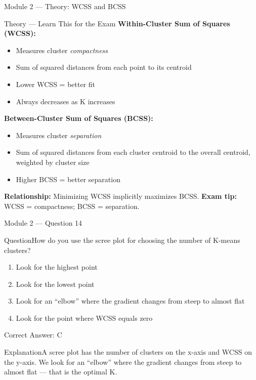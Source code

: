 \documentclass[aspectratio=169,10pt]{beamer}
\newcommand{\question}[1]{\begin{block}{Question}#1\end{block}}
\newcommand{\options}[4]{%
	\begin{enumerate}[label=\Alph*.,leftmargin=*]
		\item #1
		\item #2
		\item #3
		\item #4
	\end{enumerate}
}
\newcommand{\answerbox}[1]{\begin{exampleblock}{Correct Answer: #1}\end{exampleblock}}
\newcommand{\explain}[1]{\begin{block}{Explanation}#1\end{block}}
\newcommand{\theory}[1]{%
	\begin{block}{Theory --- Learn This for the Exam}
		\small #1
	\end{block}
}
\begin{document}
	\begin{frame}{Module 2 --- Theory: WCSS and BCSS}
		\theory{
			\textbf{Within-Cluster Sum of Squares (WCSS):}
			\begin{itemize}
				\item Measures cluster \emph{compactness}
				\item Sum of squared distances from each point to its centroid
				\item Lower WCSS = better fit
				\item Always decreases as K increases
			\end{itemize}
			\textbf{Between-Cluster Sum of Squares (BCSS):}
			\begin{itemize}
				\item Measures cluster \emph{separation}
				\item Sum of squared distances from each cluster centroid to the overall centroid, weighted by cluster size
				\item Higher BCSS = better separation
			\end{itemize}
			\textbf{Relationship:} Minimizing WCSS implicitly maximizes BCSS.
			\textbf{Exam tip:} WCSS = compactness; BCSS = separation.
		}
	\end{frame}
	
	\begin{frame}{Module 2 --- Question 14}
		\question{How do you use the scree plot for choosing the number of K-means clusters?}
		\options{Look for the highest point}{Look for the lowest point}{Look for an ``elbow'' where the gradient changes from steep to almost flat}{Look for the point where WCSS equals zero}
		\answerbox{C}
		\explain{A scree plot has the number of clusters on the x-axis and WCSS on the y-axis. We look for an ``elbow'' where the gradient changes from steep to almost flat --- that is the optimal K.}
	\end{frame}
	
\end{document}
